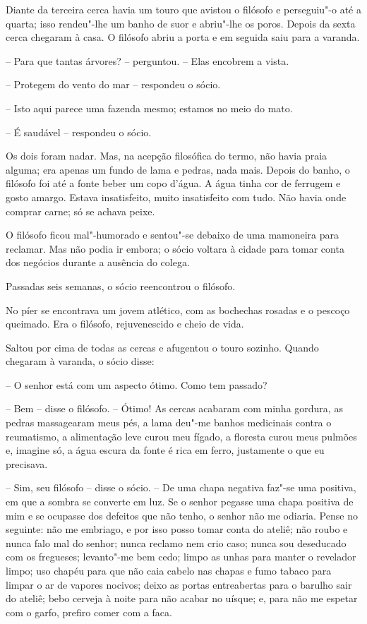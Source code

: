 Diante da terceira cerca havia um touro que avistou o filósofo e
perseguiu"-o até a quarta; isso rendeu"-lhe um banho de suor e
abriu"-lhe os poros. Depois da sexta cerca chegaram à casa. O filósofo
abriu a porta e em seguida saiu para a varanda.

-- Para que tantas árvores? -- perguntou. -- Elas encobrem a vista.

-- Protegem do vento do mar -- respondeu o sócio.

-- Isto aqui parece uma fazenda mesmo; estamos no meio do mato.

-- É saudável -- respondeu o sócio.

Os dois foram nadar. Mas, na acepção filosófica do termo, não havia
praia alguma; era apenas um fundo de lama e pedras, nada mais. Depois
do banho, o filósofo foi até a fonte beber um copo d’água. A água tinha
cor de ferrugem e gosto amargo. Estava insatisfeito, muito insatisfeito
com tudo. Não havia onde comprar carne; só se achava peixe.

O filósofo ficou mal"-humorado e sentou"-se debaixo de uma mamoneira
para reclamar. Mas não podia ir embora; o sócio voltara à cidade para
tomar conta dos negócios durante a ausência do colega.

Passadas seis semanas, o sócio reencontrou o filósofo.

No píer se encontrava um jovem atlético, com as bochechas rosadas e o pescoço
queimado. Era o filósofo, rejuvenescido e cheio de vida.

Saltou por cima de todas as cercas e afugentou o touro sozinho. Quando
chegaram à varanda, o sócio disse:

-- O senhor está com um aspecto ótimo. Como tem passado?

-- Bem -- disse o filósofo. -- Ótimo! As cercas acabaram com minha gordura,
as pedras massagearam meus pés, a lama deu"-me banhos medicinais
contra o reumatismo, a alimentação leve curou meu fígado, a floresta
curou meus pulmões e, imagine só, a água escura da fonte é rica em
ferro, justamente o que eu precisava.

-- Sim, seu filósofo -- disse o sócio. -- De uma chapa negativa faz"-se
uma positiva, em que a sombra se converte em luz. Se o senhor pegasse
uma chapa positiva de mim e se ocupasse dos defeitos que não tenho, o
senhor não me odiaria. Pense no seguinte: não me embriago, e por isso
posso tomar conta do ateliê; não roubo e nunca falo mal do senhor;
nunca reclamo nem crio caso; nunca sou deseducado com os fregueses;
levanto"-me bem cedo; limpo as unhas para manter o revelador limpo;
uso chapéu para que não caia cabelo nas chapas e fumo tabaco para
limpar o ar de vapores nocivos; deixo as portas entreabertas para o
barulho sair do ateliê; bebo cerveja à noite para não acabar no uísque;
e, para não me espetar com o garfo, prefiro comer com a faca.

